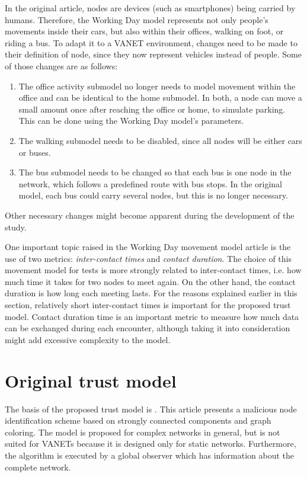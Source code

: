 In the original article, nodes are devices (such as smartphones) being carried by humans.
Therefore, the Working Day model represents not only people's movements inside their cars, but also within their offices, walking on foot, or riding a bus.
To adapt it to a VANET environment, changes need to be made to their definition of node, since they now represent vehicles instead of people. Some of those changes are as follows:
\begin{enumerate}
\item
The office activity submodel no longer needs to model movement within the office and can be identical to the home submodel.
In both, a node can move a small amount once after reaching the office or home, to simulate parking.
This can be done using the Working Day model's parameters.
\item
The walking submodel needs to be disabled, since all nodes will be either cars or buses.
\item
The bus submodel needs to be changed so that each bus is one node in the network, which follows a predefined route with bus stops.
In the original model, each bus could carry several nodes, but this is no longer necessary.
\end{enumerate}
Other necessary changes might become apparent during the development of the study.

One important topic raised in the Working Day movement model article is the use of two metrics: \textit{inter-contact times} and \textit{contact duration}.
The choice of this movement model for tests is more strongly related to inter-contact times, i.e. how much time it takes for two nodes to meet again.
On the other hand, the contact duration is how long each meeting lasts.
For the reasons explained earlier in this section, relatively short inter-contact times is important for the proposed trust model.
Contact duration time is an important metric to measure how much data can be exchanged during each encounter, although taking it into consideration might add excessive complexity to the model.


\section{Original trust model}

The basis of the proposed trust model is \cite{vernize2015malicious}.
This article presents a malicious node identification scheme based on strongly connected components and graph coloring.
The model is proposed for complex networks in general, but is not suited for VANETs because it is designed only for static networks.
Furthermore, the algorithm is executed by a global observer which has information about the complete network.

